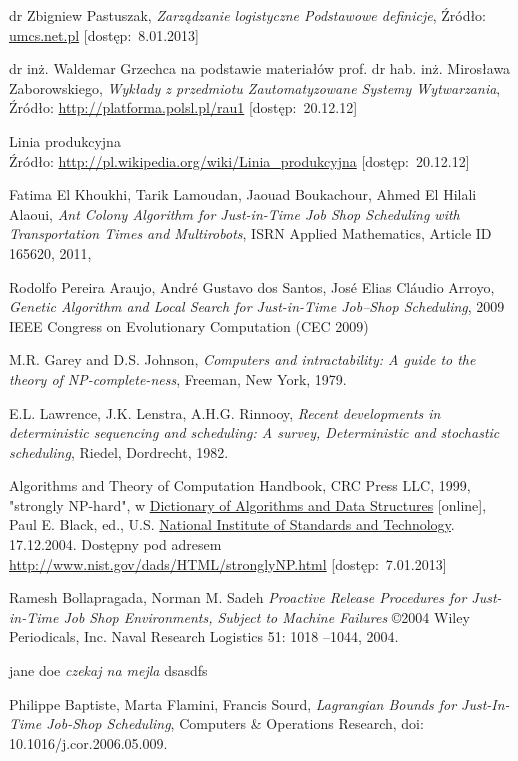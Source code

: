 \documentclass[twoside]{kInzynierka}
\begin{document}
\begin{thebibliography}{10}

dr Zbigniew Pastuszak,
\emph{Zarządzanie logistyczne Podstawowe definicje},
Źródło: \url{umcs.net.pl} [dostęp:~8.01.2013]

dr inż. Waldemar Grzechca na podstawie materiałów prof. dr hab. inż. Mirosława Zaborowskiego,
\emph{Wykłady z przedmiotu Zautomatyzowane Systemy Wytwarzania},
Źródło: \url{http://platforma.polsl.pl/rau1} [dostęp:~20.12.12]

Linia produkcyjna \\
Źródło: \url{http://pl.wikipedia.org/wiki/Linia_produkcyjna} [dostęp:~20.12.12]

Fatima El Khoukhi, Tarik Lamoudan, Jaouad Boukachour, Ahmed El Hilali Alaoui,  
\emph{Ant Colony Algorithm for Just-in-Time Job Shop Scheduling with Transportation Times and Multirobots},
ISRN Applied Mathematics, Article ID 165620, 2011, 

Rodolfo Pereira Araujo, André Gustavo dos Santos, José Elias Cláudio Arroyo,
\emph{Genetic Algorithm and Local Search for Just-in-Time Job–Shop Scheduling},
2009 IEEE Congress on Evolutionary Computation (CEC 2009)

M.R. Garey and D.S. Johnson, 
\emph{Computers and intractability: A guide to the theory of NP-complete-ness},
Freeman, New York, 1979.

E.L. Lawrence, J.K. Lenstra, A.H.G. Rinnooy, 
\emph{Recent developments in deterministic sequencing and scheduling: A survey, Deterministic and stochastic scheduling},
Riedel, Dordrecht, 1982.

Algorithms and Theory of Computation Handbook, CRC Press LLC, 1999, "strongly NP-hard", w \href{http://xlinux.nist.gov/dads/}{Dictionary of Algorithms and Data Structures} [online], Paul E. Black, ed., U.S. \href{http://www.nist.gov/}{National Institute of Standards and Technology}. 17.12.2004. Dostępny pod adresem \url{http://www.nist.gov/dads/HTML/stronglyNP.html} [dostęp:~7.01.2013]

\newpage

Ramesh Bollapragada, Norman M. Sadeh
\emph{Proactive Release Procedures for Just-in-Time Job Shop Environments, Subject to Machine Failures}
\copyright 2004 Wiley Periodicals, Inc. Naval Research Logistics 51: 1018 –1044, 2004.

jane doe
\emph{czekaj na mejla}
dsasdfs

Philippe Baptiste, Marta Flamini, Francis Sourd,
\emph{Lagrangian Bounds for Just-In-Time Job-Shop Scheduling},
Computers \& Operations Research, doi: 10.1016/j.cor.2006.05.009.

\end{thebibliography}
\end{document}

